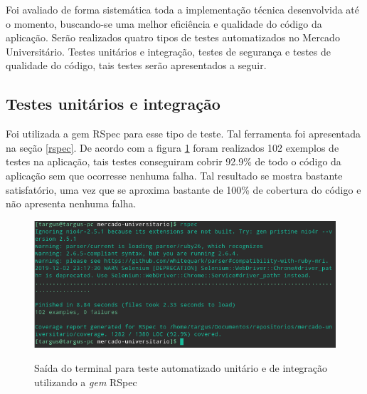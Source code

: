 Foi avaliado de forma sistemática toda a implementação técnica desenvolvida até o momento, buscando-se uma melhor eficiência e qualidade do código da aplicação. Serão realizados quatro tipos de testes automatizados no Mercado Universitário. Testes unitários e integração, testes de segurança e testes de qualidade do código, tais testes serão apresentados a seguir.

\subsection{Testes unitários e integração}
Foi utilizada a gem RSpec para esse tipo de teste. Tal ferramenta foi apresentada na seção \ref{rspec}. De acordo com a figura \ref{fig:rspec} foram realizados 102 exemplos de testes na aplicação, tais testes conseguiram cobrir 92.9\% de todo o código da   aplicação sem que ocorresse nenhuma falha. Tal resultado se mostra bastante satisfatório, uma vez que se aproxima bastante de 100\% de cobertura do código e não apresenta nenhuma falha.
\begin{figure}[htbp!]
  \centering
  \caption{Saída do terminal para teste automatizado unitário e de integração utilizando a \textit{gem} RSpec}
  \includegraphics[width=1\textwidth]{figs/rspec.png}
    \label{fig:rspec}
\end{figure}
